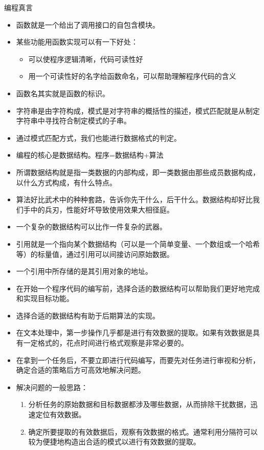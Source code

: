 \begin{frame}
\begin{block}{编程真言}
\begin{itemize}
      \item 函数就是一个给出了调用接口的自包含模块。
      \item 某些功能用函数实现可以有一下好处：
        \begin{itemize}
          \item 可以使程序逻辑清晰，代码可读性好
          \item 用一个可读性好的名字给函数命名，可以帮助理解程序代码的含义
        \end{itemize}
      \item 函数名其实就是函数的标识。
      \item 字符串是由字符构成，模式是对字符串的概括性的描述，模式匹配就是从制定字符串中寻找符合制定模式的子串。
      \item 通过模式匹配方式，我们也能进行数据格式的判定。
      \item 编程的核心是数据结构。程序=数据结构+算法
      \item 所谓数据结构就是指一类数据的内部构成，即一类数据由那些成员数据构成，以什么方式构成，有什么特点。
      \item 算法好比武术中的种种套路，告诉你先干什么，后干什么。数据结构却好比我们手中的兵刃，性能好坏导致使用效果大相径庭。
      \item 一个复杂的数据结构可以比作一件复杂的武器。 
      \item 引用就是一个指向某个数据结构（可以是一个简单变量、一个数组或一个哈希等）的标量值，通过引用可以间接访问原始数据。
      \item 一个引用中所存储的是其引用对象的地址。
      \item 在开始一个程序代码的编写前，选择合适的数据结构可以帮助我们更好地完成和实现目标功能。
      \item 选择合适的数据结构有助于后期算法的实现。
      \item 在文本处理中，第一步操作几乎都是进行有效数据的提取。如果有效数据是具有一定格式的，花点时间进行格式观察是非常必要的。
      \item 在拿到一个任务后，不要立即进行代码编写，而要先对任务进行审视和分析，确定合适的策略后方可高效地解决问题。
      \item 解决问题的一般思路：
        \begin{enumerate}
          \item 分析任务的原始数据和目标数据都涉及哪些数据，从而排除干扰数据，迅速定位有效数据。
          \item 确定所要提取的有效数据后，观察有效数据的格式。通常利用分隔符可以较为便捷地构造出合适的模式以进行有效数据的提取。

\end{enumerate}
\end{itemize}
\end{block}
\end{frame}
